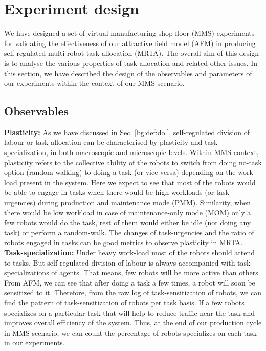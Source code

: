 \section{Experiment design}
\label{afm:expt-design}
We have designed a set of virtual manufacturing shop-floor (MMS) experiments for validating the effectiveness of our attractive field model (AFM)  in producing self-regulated multi-robot task allocation (MRTA).  The overall aim of this design is to analyse the various properties of task-allocation and related other issues. In this section, we have described the design of the observables and parameters of our experiments within the context of our MMS scenario. 
\subsection{Observables}
\textbf{Plasticity:} As we have discussed in Sec. \ref{bg:def:dol},  self-regulated division of labour or task-allocation can be characterised by plasticity and task-specialization, in both macroscopic and microscopic levels. Within MMS context, plasticity refers to the collective ability of the robots to switch from doing no-task option (random-walking) to doing a task (or vice-versa) depending on the work-load present in the system. Here we expect to see that most of the robots would be able to engage in tasks when there would be high workloads (or task-urgencies) during production and maintenance mode (PMM). Similarity, when there would be low workload in case of maintenance-only mode (MOM) only a few robots would do the task, rest of them would either be idle (not doing any task) or perform a random-walk.  The changes of task-urgencies and the ratio of robots engaged in tasks can be good metrics to observe plasticity in MRTA.\\
\textbf{Task-specialization:} Under heavy work-load most of the robots should attend to tasks. But self-regulated division of labour is always accompanied with task-specializations of agents. That means, few robots will be more active than others. From AFM, we can see that after doing a task a few times, a robot will soon be sensitized to it. Therefore, from the raw log of task-sensitization of robots, we can find the pattern of task-sensitization of robots per task basis. If a few robots specializes on a particular task that will help to reduce traffic near the task and improves overall efficiency of the system. Thus, at the end of our production cycle in MMS scenario, we can count the percentage of robots specializes on each task in our experiments.\\
